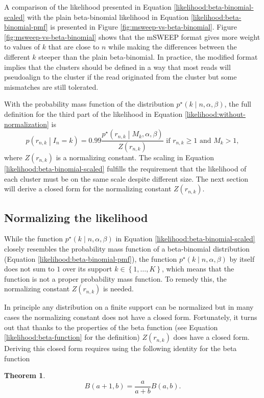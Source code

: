 \documentclass[officiallayout]{tktla}
\newtheorem{theorem}{Theorem}[chapter]
\begin{document}
A comparison of the likelihood presented in Equation
\ref{likelihood:beta-binomial-scaled} with the plain beta-binomial
likelihood in Equation \ref{likelihood:beta-binomial-pmf} is presented
in Figure \ref{fig:msweep-vs-beta-binomial}. Figure
\ref{fig:msweep-vs-beta-binomial} shows that the mSWEEP format gives
more weight to values of $k$ that are close to $n$ while making the
differences between the different $k$ steeper than the plain
beta-binomial. In practice, the modified format implies that the
clusters should be defined in a way that most reads will pseudoalign
to the cluster if the read originated from the cluster but some
mismatches are still tolerated.

With the probability mass function of the distribution
$p^{\star}\left(k \middle| n, \alpha, \beta\right)$, the full
definition for the third part of the likelihood in Equation \ref{likelihood:without-normalization} is
\begin{equation}
  \label{likelihood:normalized}
  p\left(r_{n, k} \middle| I_{n} = k\right) = 0.99\frac{p^{\star}\left(r_{n, k} \middle| M_{k}, \alpha, \beta\right)}{Z\left(r_{n, k}\right)}\text{ if } r_{n, k} \geq 1\text{ and } M_{k} > 1,
\end{equation}
where $Z\left(r_{n, k}\right)$ is a normalizing constant. The scaling
in Equation \ref{likelihood:beta-binomial-scaled} fulfills the
requirement that the likelihood of each cluster must be on the same
scale despite different size. The next section will derive a closed
form for the normalizing constant $Z\left(r_{n, k}\right)$.

\subsection{Normalizing the likelihood}

While the function $p^{\star}\left(k \middle| n, \alpha, \beta\right)$
in Equation \ref{likelihood:beta-binomial-scaled} closely resembles
the probability mass function of a beta-binomial distribution
(Equation \ref{likelihood:beta-binomial-pmf}), the function
$p^{\star}\left(k \middle| n, \alpha, \beta\right)$ by itself does not
sum to $1$ over its support $k \in \left\{ 1, \dots, K \right\}$,
which means that the function is not a proper probability mass
function. To remedy this, the normalizing constant $Z\left(r_{n,
  k}\right)$ is needed.

In principle any distribution on a finite support can be normalized
but in many cases the normalizing constant does not have a closed
form. Fortunately, it turns out that \textemdash thanks to the
properties of the beta function (see Equation
\ref{likelihood:beta-function} for the definition) \textemdash
$Z\left(r_{n, k}\right)$ does have a closed form. Deriving this closed
form requires using the following identity for the beta function
\begin{theorem}
  \label{lemma:beta-function-identity}
  \[
  B\left(a + 1, b\right) = \frac{a}{a + b}B\left(a, b\right).
  \]
\end{theorem}
\end{document}
